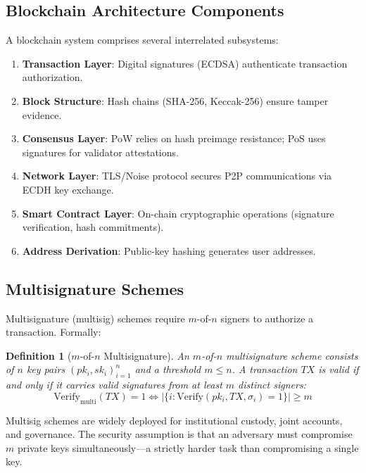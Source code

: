 \documentclass[12pt, a4paper, twocolumn]{article}
\newtheorem{definition}{Definition}
\begin{document}
\subsection{Blockchain Architecture Components}

A blockchain system comprises several interrelated subsystems:

\begin{enumerate}[noitemsep]
  \item \textbf{Transaction Layer}: Digital signatures (ECDSA) authenticate transaction authorization.
  \item \textbf{Block Structure}: Hash chains (SHA-256, Keccak-256) ensure tamper evidence.
  \item \textbf{Consensus Layer}: PoW relies on hash preimage resistance; PoS uses signatures for validator attestations.
  \item \textbf{Network Layer}: TLS/Noise protocol secures P2P communications via ECDH key exchange.
  \item \textbf{Smart Contract Layer}: On-chain cryptographic operations (signature verification, hash commitments).
  \item \textbf{Address Derivation}: Public-key hashing generates user addresses.
\end{enumerate}

\subsection{Multisignature Schemes}

Multisignature (multisig) schemes require $m$-of-$n$ signers to authorize a transaction. Formally:

\begin{definition}[$m$-of-$n$ Multisignature]
An $m$-of-$n$ multisignature scheme consists of $n$ key pairs $(pk_i, sk_i)_{i=1}^{n}$ and a threshold $m \leq n$. A transaction $TX$ is valid if and only if it carries valid signatures from at least $m$ distinct signers:
\[
\text{Verify}_{\text{multi}}(TX) = 1 \iff |\{i : \text{Verify}(pk_i, TX, \sigma_i) = 1\}| \geq m
\]
\end{definition}

Multisig schemes are widely deployed for institutional custody, joint accounts, and governance. The security assumption is that an adversary must compromise $m$ private keys simultaneously---a strictly harder task than compromising a single key.

\end{document}
